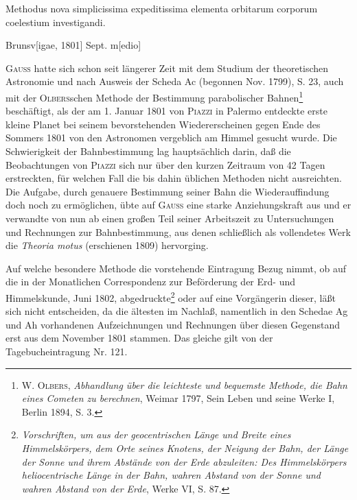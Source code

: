 \noindent\hspace*{\parindent}Methodus nova simplicissima expeditissima elementa orbitarum corporum coelestium investigandi.
\par\noindent\hfill Brunsv[igae, 1801] Sept. m[edio]
\par\medskip\begingroup\small
\renewcommand{\thefootnote}{*)}
\noindent\hspace*{\parindent}\textsc{Gauss} hatte sich schon seit längerer Zeit mit dem Studium der theoretischen Astronomie und nach Ausweis der Scheda Ac (begonnen Nov. 1799), S. 23, auch mit der \textsc{Olbers}schen Methode der Bestimmung parabolischer Bahnen\footnote{\textsc{W. Olbers}, \textit{Abhandlung über die leichteste und bequemste Methode, die Bahn eines Cometen zu berechnen}, Weimar 1797, Sein Leben und seine Werke I, Berlin 1894, S. 3.} beschäftigt, als der am 1. Januar 1801 von \textsc{Piazzi} in Palermo entdeckte erste kleine Planet  bei seinem bevorstehenden Wiedererscheinen gegen Ende des Sommers 1801 von den Astronomen vergeblich am Himmel gesucht wurde. Die Schwierigkeit der Bahnbestimmung lag hauptsächlich darin, daß die Beobachtungen von \textsc{Piazzi} sich nur über den kurzen Zeitraum von 42 Tagen erstreckten, für welchen Fall die bis dahin üblichen Methoden nicht ausreichten. Die Aufgabe, durch genauere Bestimmung seiner Bahn die Wiederauffindung doch noch zu ermöglichen, übte auf \textsc{Gauss} eine starke Anziehungskraft aus und er verwandte von nun ab einen großen Teil seiner Arbeitszeit zu Untersuchungen und Rechnungen zur Bahnbestimmung, aus denen schließlich als vollendetes Werk die \textit{Theoria motus} (erschienen 1809) hervorging.
\par\noindent\hspace*{\parindent}Auf welche besondere Methode die vorstehende Eintragung Bezug nimmt, ob auf die in der Monatlichen Correspondenz zur Beförderung der Erd- und Himmelskunde, Juni 1802, abgedruckte\renewcommand{\thefootnote}{**)}\footnote{\textit{Vorschriften, um aus der geocentrischen Länge und Breite eines Himmelskörpers, dem Orte seines Knotens, der Neigung der Bahn, der Länge der Sonne und ihrem Abstände von der Erde abzuleiten: Des Himmelskörpers heliocentrische Länge in der Bahn, wahren Abstand von der Sonne und wahren Abstand von der Erde}, Werke VI, S. 87.} oder auf eine Vorgängerin dieser, läßt sich nicht entscheiden, da die ältesten im Nachlaß, namentlich in den Schedae Ag und Ah vorhandenen Aufzeichnungen und Rechnungen über diesen Gegenstand erst aus dem November 1801 stammen. Das gleiche gilt von der Tagebucheintragung Nr. 121.
